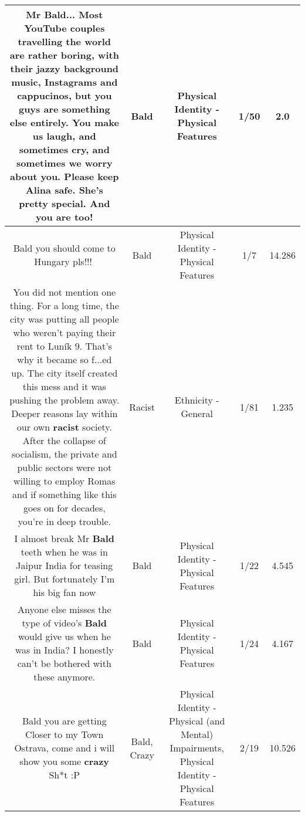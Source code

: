 \documentclass[11pt]{article}
\newlength\mylength
\begin{document}
\begin{center}
\begin{longtable}{|C{.65\mylength}|C{.30\mylength}|C{.12\mylength}|C{.12\mylength}|C{.12\mylength}|}
  \small Mr \textbf{Bald}... Most YouTube couples travelling the world are rather boring, with their jazzy background music, Instagrams and cappucinos, but you guys are something else entirely. You make us laugh, and sometimes cry, and sometimes we worry about you.  Please keep Alina safe. She's pretty special. And you are too!\normalsize   & Bald & Physical Identity - Physical Features & 1/50 & 2.0 \\  \hline
  \small Bald you should come to Hungary pls!!!👀\normalsize   & Bald & Physical Identity - Physical Features & 1/7 & 14.286 \\  \hline
  \small You did not mention one thing. For a long time, the city was putting all people who weren't paying their rent to Luník 9. That's why it became so f...ed up. The city itself created this mess and it was pushing the problem away. Deeper reasons lay within our own \textbf{racist} society. After the collapse of socialism, the private and public sectors were not willing to employ Romas and if something like this goes on for decades, you're in deep trouble.\normalsize   & Racist & Ethnicity - General & 1/81 & 1.235 \\  \hline
  \small I almost break Mr \textbf{Bald} teeth when he was in Jaipur India for teasing  girl.  But fortunately I'm his big fan now\normalsize   & Bald & Physical Identity - Physical Features & 1/22 & 4.545 \\  \hline
  \small Anyone else misses the type of video's \textbf{Bald} would give us when he was in India? I honestly can't be bothered with these anymore.\normalsize   & Bald & Physical Identity - Physical Features & 1/24 & 4.167 \\  \hline
  \small Bald you are getting Closer to my Town Ostrava, come and i will show you some \textbf{crazy} Sh*t :P\normalsize   & Bald, Crazy & Physical Identity - Physical (and Mental) Impairments, Physical Identity - Physical Features & 2/19 & 10.526 \\  \hline

\end{longtable}
\end{center}
\end{document}
